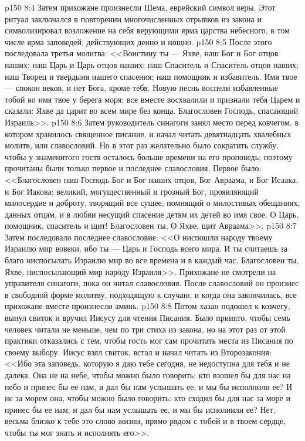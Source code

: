 \vs p150 8:4 Затем прихожане произнесли Шема, еврейский символ веры. Этот ритуал заключался в повторении многочисленных отрывков из закона и символизировал возложение на себя верующими ярма царства небесного, в том числе ярма заповедей, действующих денно и нощно.
\vs p150 8:5 После этого последовала третья молитва: <<Воистину ты --- Яхве, наш Бог и Бог отцов наших; наш Царь и Царь отцов наших; наш Спаситель и Спаситель отцов наших; наш Творец и твердыня нашего спасения; наш помощник и избавитель. Имя твое --- спокон веков, и нет Бога, кроме тебя. Новую песнь воспели избавленные тобой во имя твое у берега моря; все вместе восхвалили и признали тебя Царем и сказали: Яхве да царит во всем мире без конца. Благословен Господь, спасающий Израиль>>.
\vs p150 8:6 Затем руководитель синагоги занял место перед ковчегом, в котором хранилось священное писание, и начал читать девятнадцать хвалебных молитв, или славословий. Но в этот раз желательно было сократить службу, чтобы у знаменитого гостя осталось больше времени на его проповедь; поэтому прочитаны были только первое и последнее славословия. Первое было: <<Благословен наш Господь Бог и Бог наших отцов, Бог Авраама, и Бог Исаака, и Бог Иакова; великий, могущественный и грозный Бог, проявляющий милосердие и доброту, творящий все сущее, помнящий о милостивых обещаниях, данных отцам, и в любви несущий спасение детям их детей во имя свое. О Царь, помощник, спаситель и щит! Благословен ты, О Яхве, щит Авраама>>.
\vs p150 8:7 Затем последовало последнее славословие: <<О ниспошли народу твоему Израилю мир вовеки, ибо ты --- Царь и Господь всего мира. И ты считаешь за благо ниспосылать Израилю мир во все времена и в каждый час. Благословен ты, Яхве, ниспосылающий мир народу Израиля>>. Прихожане не смотрели на управителя синагоги, пока он читал славословия. После славословий он произнес в свободной форме молитву, подходящую к случаю, и когда она закончилась, все прихожане вместе произнесли аминь.
\vs p150 8:8 Потом хазан подошел к ковчегу, вынул свиток и вручил Иисусу для чтения Писания. Было принято, чтобы семь человек читали не меньше, чем по три стиха из закона, но на этот раз от этой практики отказались с тем, чтобы гость мог сам прочитать места из Писания по своему выбору. Иисус взял свиток, встал и начал читать из Второзакония: <<Ибо эта заповедь, которую я даю тебе сегодня, не недоступна для тебя и не далека. Она не на небе, чтобы можно было говорить: кто взошел бы для нас на небо и принес бы ее нам, и дал бы нам услышать ее, и мы бы исполнили ее? И не за морем она, чтобы можно было говорить: кто сходил бы для нас за море и принес бы ее нам, и дал бы нам услышать ее, и мы бы исполнили ее? Нет, весьма близко к тебе это слово жизни, прямо рядом с тобой и в твоем сердце, чтобы ты мог знать и исполнять его>>.
